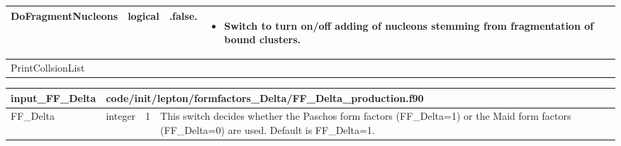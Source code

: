 \documentclass{article}
\begin{document}
\begin{longtable}{llll}
\midrule
DoFragmentNucleons & \begin{minipage}[t]{2cm}logical\end{minipage} & \begin{minipage}[t]{2cm}.false.\end{minipage} & \begin{minipage}[t]{12cm}\begin{itemize}\leftmargin0em\itemindent0pt\item Switch to turn on/off adding of nucleons stemming from fragmentation   of bound clusters.\end{itemize}\end{minipage}\\*
\midrule
PrintCollsionList & \begin{minipage}[t]{2cm}\end{minipage} & \begin{minipage}[t]{2cm}\end{minipage} & \begin{minipage}[t]{12cm}\end{minipage}\\*
\bottomrule
\end{longtable}
{ }




\begin{longtable}{llll}
\toprule
\textbf{\large{input\_FF\_Delta}} & \multicolumn{3}{l}{\footnotesize{code/init/lepton/formfactors\_Delta/FF\_Delta\_production.f90}}\\*
\midrule
\endfirsthead
\midrule
\endhead
FF\_Delta & \begin{minipage}[t]{2cm}integer\end{minipage} & \begin{minipage}[t]{2cm}1\end{minipage} & \begin{minipage}[t]{12cm}This switch decides whether the Paschos form factors (FF\_Delta=1) or the Maid form factors (FF\_Delta=0) are used. Default is FF\_Delta=1.\end{minipage}\\*
\bottomrule
\end{longtable}
{ }



\end{document}
